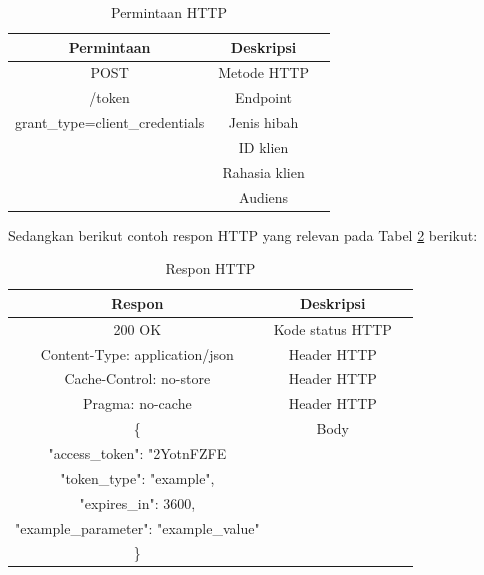\begin{table}[H]
    \caption{Permintaan HTTP}
    \vspace{0.5em}
    \centering
    \begin{tabular}{|c|c|c|}
        \hline
        Permintaan & Deskripsi \\
        \hline \hline
        POST & Metode HTTP \\
        \hline
        /token & Endpoint \\
        \hline
        grant\_type=client\_credentials & Jenis hibah \\
        \hline
        & ID klien \\
        \hline
        & Rahasia klien \\
        \hline
        & Audiens \\
        \hline
    \end{tabular}
    \label{tab:req_http}
\end{table}

Sedangkan berikut contoh respon HTTP yang relevan pada Tabel \ref{tab:res_http} berikut:

\begin{table}[h]
    \caption{Respon HTTP}
    \vspace{0.5em}
    \centering
    \begin{tabular}{|c|c|c|}
        \hline
        Respon & Deskripsi \\
        \hline \hline
        200 OK & Kode status HTTP \\
        \hline
        Content-Type: application/json & Header HTTP \\
        \hline
        Cache-Control: no-store & Header HTTP \\
        \hline
        Pragma: no-cache & Header HTTP \\
        \hline
        \{ & Body \\
        \hline
        "access\_token": "2YotnFZFE & \\
        \hline
        "token\_type": "example", & \\
        \hline
        "expires\_in": 3600, & \\
        \hline
        "example\_parameter": "example\_value" & \\
        \hline
        \} & \\
        \hline
    \end{tabular}
    \label{tab:res_http}
\end{table}

